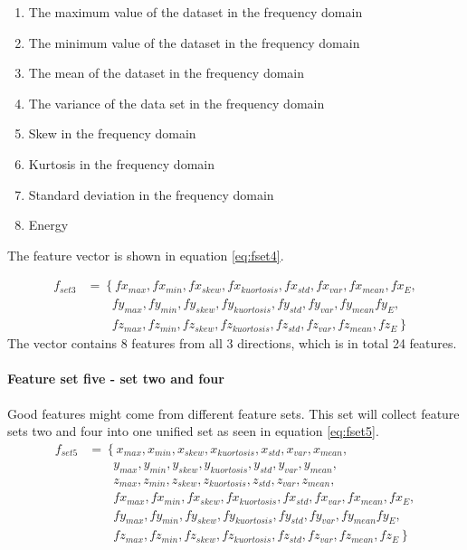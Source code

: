 \documentclass[USenglish]{ifimaster}  %
\begin{document}
\begin{enumerate}
		\item The maximum value of the dataset in the frequency domain
		\item The minimum value of the dataset in the frequency domain
		\item The mean of the dataset in the frequency domain
		\item The variance of the data set in the frequency domain
		\item Skew in the frequency domain
		\item Kurtosis in the frequency domain 
		\item Standard deviation in the frequency domain
		\item Energy 
\end{enumerate}
The feature vector is shown in equation \ref{eq:fset4}.

\begin{align}\label{eq:fset4}
	f_{set3} &= \left\{fx_{max},fx_{min},fx_{skew},fx_{kuortosis},fx_{std},fx_{var},fx_{mean},fx_{E}, \right.\nonumber\\
	&\qquad \left.{} fy_{max},fy_{min},fy_{skew},fy_{kuortosis},fy_{std},fy_{var},fy_{mean}fy_{E}, \right.\nonumber\\
	&\qquad \left.{} fz_{max},fz_{min},fz_{skew},fz_{kuortosis},fz_{std},fz_{var},fz_{mean},fz_{E} \right\}
	\end{align}
The vector contains 8 features from all 3 directions, which is in total 24 features. 
	
\paragraph{Feature set five - set two and four} 
Good features might come from different feature sets. This set will collect feature sets two and four into one unified set as seen in equation \ref{eq:fset5}. 
	\begin{align}\label{eq:fset5}
	f_{set5} &= \left\{x_{max},x_{min},x_{skew},x_{kuortosis},x_{std},x_{var},x_{mean}, \right.\nonumber\\
	&\qquad \left.{}   y_{max},y_{min},y_{skew},y_{kuortosis},y_{std},y_{var},y_{mean}, \right.\nonumber\\
	&\qquad \left.{}  z_{max},z_{min},z_{skew},z_{kuortosis},z_{std},z_{var},z_{mean}, \right.\nonumber\\
	&\qquad \left.{} fx_{max},fx_{min},fx_{skew},fx_{kuortosis},fx_{std},fx_{var},fx_{mean},fx_{E}, \right.\nonumber\\
	&\qquad \left.{} fy_{max},fy_{min},fy_{skew},fy_{kuortosis},fy_{std},fy_{var},fy_{mean}fy_{E}, \right.\nonumber\\
	&\qquad \left.{} fz_{max},fz_{min},fz_{skew},fz_{kuortosis},fz_{std},fz_{var},fz_{mean},fz_{E} \right\}
	\end{align}
	
\end{document}
